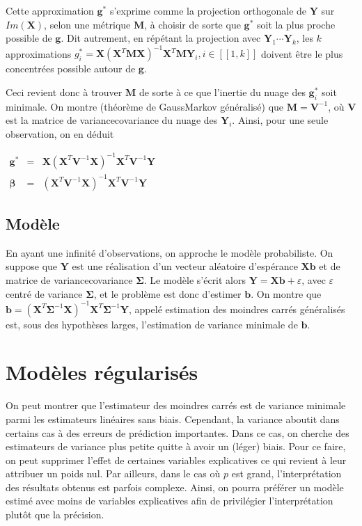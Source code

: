 \documentclass[letterpaper,10pt,english]{jupyterBook}
\begin{document}
\sphinxAtStartPar
Cette approximation \(\mathbf g^*\) s’exprime comme la projection orthogonale de \(\mathbf Y\) sur \(Im(\mathbf X)\), selon une métrique \(\mathbf M\), à choisir de sorte que \(\mathbf g^*\) soit la plus proche possible de \(\mathbf g\). Dit autrement, en répétant la projection avec \(\mathbf Y_1\cdots \mathbf Y_k\), les \(k\) approximations \(g^*_i=\mathbf X (\mathbf X^T\mathbf M\mathbf X)^{-1} \mathbf X^T \mathbf M \mathbf Y_i, i\in[\![1,k]\!]\) doivent être le plus concentrées possible autour de \(\mathbf g\).

\sphinxAtStartPar
Ceci revient donc à trouver \(\mathbf M\) de sorte à ce que l’inertie du nuage des \(\mathbf g_i^*\) soit minimale. On montre (théorème de Gauss\sphinxhyphen{}Markov généralisé) que \(\mathbf M=\mathbf V^{-1}\), où \(\mathbf V\) est la matrice de variance\sphinxhyphen{}covariance du nuage des \(\mathbf Y_i\). Ainsi, pour une seule observation, on en déduit

\sphinxAtStartPar
\(\begin{eqnarray*}
\mathbf g^*&=&\mathbf X(\mathbf X^T\mathbf V^{-1}\mathbf X)^{-1}\mathbf X^T\mathbf V^{-1}\mathbf Y\\
\boldsymbol \beta&=&(\mathbf X^T\mathbf V^{-1}\mathbf X)^{-1}\mathbf X^T\mathbf V^{-1}\mathbf Y
\end{eqnarray*}\)


\subsection{Modèle}
\label{\detokenize{regression:id1}}
\sphinxAtStartPar
En ayant une infinité d’observations, on approche le modèle probabiliste. On suppose que \(\mathbf Y\) est une réalisation d’un vecteur aléatoire d’espérance \(\mathbf X\mathbf b\) et de matrice de variance\sphinxhyphen{}covariance \(\boldsymbol\Sigma\). Le modèle s’écrit alors  \(\mathbf Y=\mathbf X\mathbf b+\varepsilon\), avec \(\varepsilon\) centré de variance \(\boldsymbol\Sigma\), et le problème est donc d’estimer \(\mathbf b\). On montre que  \(\mathbf b = (\mathbf X^T \boldsymbol\Sigma^{-1}\mathbf X)^{-1}\mathbf X^T\boldsymbol\Sigma^{-1}\mathbf Y\), appelé estimation des moindres carrés généralisés est, sous des hypothèses larges, l’estimation de variance minimale de \(\mathbf b\).


\section{Modèles régularisés}
\label{\detokenize{regression:modeles-regularises}}
\sphinxAtStartPar
On peut montrer que l’estimateur des moindres carrés est de variance minimale parmi les estimateurs linéaires sans biais. Cependant, la variance aboutit dans certains cas à des erreurs de prédiction importantes. Dans ce cas, on cherche des estimateurs de variance plus petite quitte à avoir un (léger) biais. Pour ce faire, on peut supprimer l’effet de certaines variables explicatives ce qui revient à leur attribuer un poids nul.
Par ailleurs, dans le cas où \(p\) est grand, l’interprétation des résultats obtenus est parfois complexe. Ainsi, on pourra préférer un modèle estimé avec moins de variables explicatives afin de privilégier l’interprétation plutôt que la précision.
\end{document}
